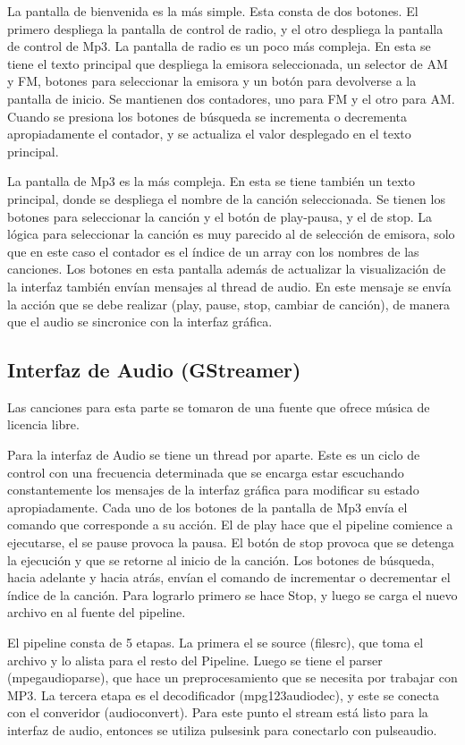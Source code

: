 La pantalla de bienvenida es la más simple. Esta consta de dos botones. El primero despliega la
pantalla de control de radio, y el otro despliega la pantalla de control de Mp3. La pantalla de
radio es un poco más compleja. En esta se tiene el texto principal que despliega la emisora
seleccionada, un selector de AM y FM, botones para seleccionar la emisora y un botón para devolverse
a la pantalla de inicio. Se mantienen dos contadores, uno para FM y el otro para AM. Cuando se
presiona los botones de búsqueda se incrementa o decrementa apropiadamente el contador, y se
actualiza el valor desplegado en el texto principal.

La pantalla de Mp3 es la más compleja. En esta se tiene también un texto principal, donde se
despliega el nombre de la canción seleccionada. Se tienen los botones para seleccionar la canción y
el botón de play-pausa, y el de stop. La lógica para seleccionar la canción es muy parecido al de
selección de emisora, solo que en este caso el contador es el índice de un array con los nombres de
las canciones. Los botones en esta pantalla además de actualizar la visualización de la interfaz
también envían mensajes al thread de audio. En este mensaje se envía la acción que se debe realizar
(play, pause, stop, cambiar de canción), de manera que el audio se sincronice con la interfaz
gráfica. 

\subsection{Interfaz de Audio (GStreamer)}
\label{sec:gstramer}
Las canciones para esta parte se tomaron de una fuente que ofrece música de licencia libre. %

Para la interfaz de Audio se tiene un thread por aparte. Este es un ciclo de control con una
frecuencia determinada que se encarga estar escuchando constantemente los mensajes de la interfaz
gráfica para modificar su estado apropiadamente. Cada uno de los botones de la pantalla de Mp3 envía
el comando que corresponde a su acción. El de play hace que el pipeline comience a ejecutarse, el se
pause provoca la pausa. El botón de stop provoca que se detenga la ejecución y que se retorne al
inicio de la canción. Los botones de búsqueda, hacia adelante y hacia atrás, envían el comando de
incrementar o decrementar el índice de la canción. Para lograrlo primero se hace Stop, y luego se
carga el nuevo archivo en al fuente del pipeline. 

El pipeline consta de 5 etapas. La primera el se source (filesrc), que toma el archivo y lo alista
para el resto del Pipeline. Luego se tiene el parser (mpegaudioparse), que hace un preprocesamiento
que se necesita por trabajar con MP3. La tercera etapa es el decodificador (mpg123audiodec), y este
se conecta con el converidor (audioconvert). Para este punto el stream está listo para la interfaz
de audio, entonces se utiliza pulsesink para conectarlo con pulseaudio. 



